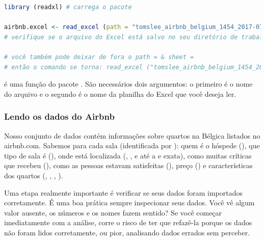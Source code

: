 \documentclass{article}
\begin{document}
\begin{lstlisting}[language=R]
library (readxl) # carrega o pacote

airbnb.excel <- read_excel (path = "tomslee_airbnb_belgium_1454_2017-07-14.xlsx", sheet = "Sheet1")
# verifique se o arquivo do Excel está salvo no seu diretório de trabalho

# você também pode deixar de fora o path = & sheet =
# então o comando se torna: read_excel ("tomslee_airbnb_belgium_1454_2017-07-14.xlsx", "Sheet1")
\end{lstlisting}


 é uma função do pacote . São necessários dois argumentos: o primeiro é o nome do arquivo e o segundo é o nome da planilha do Excel que você deseja ler.

\subsubsection{Lendo os dados do Airbnb}

Nosso conjunto de dados contém informações sobre quartos na Bélgica listados no airbnb.com. Sabemos para cada sala (identificada por ): quem é o hóspede (), que tipo de sala é (), onde está localizada (, ,  e até a  e  exata), como muitas críticas que recebeu (), como as pessoas estavam satisfeitas (), preço () e características dos quartos (, , , ).

Uma etapa realmente importante é verificar se seus dados foram importados corretamente. É uma boa prática sempre inspecionar seus dados. Você vê algum valor ausente, os números e os nomes fazem sentido? Se você começar imediatamente com a análise, corre o risco de ter que refazê-la porque os dados não foram lidos corretamente, ou pior, analisando dados errados sem perceber.
\end{document}
